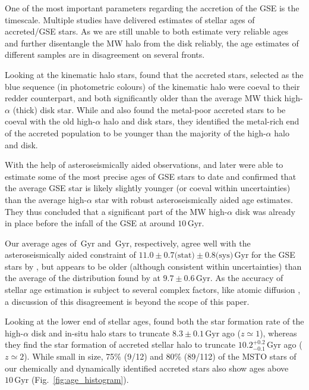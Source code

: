 \documentclass[fleqn,usenatbib]{mnras}
\newcommand{\Gyr}{\,\mathrm{Gyr}}	%
\begin{document}
One of the most important parameters regarding the accretion of the GSE is the timescale. Multiple studies \citep[e.g.][]{Jofre2010, Schuster2012, Hawkins2014, Gallart2019, Das2020, Montalban2020} have delivered estimates of stellar ages of accreted/GSE stars. As we are still unable to both estimate very reliable ages and further disentangle the MW halo from the disk reliably, the age estimates of different samples are in disagreement on several fronts.

Looking at the kinematic halo stars, \citet{Gallart2019} found that the accreted stars, selected as the blue sequence (in photometric colours) of the kinematic halo were coeval to their redder counterpart, and both significantly older than the average MW thick high-$\alpha$ (thick) disk star. While \citet{Schuster2012} and \citet{Hawkins2014} also found the metal-poor accreted stars to be coeval with the old high-$\alpha$ halo and disk stars, they identified the metal-rich end of the accreted population to be younger than the majority of the high-$\alpha$ halo and disk.

With the help of asteroseismically aided observations, \citet{Chaplin2020} and later \citet{Montalban2020} were able to estimate some of the most precise ages of GSE stars to date and confirmed that the average GSE star is likely slightly younger (or coeval within uncertainties) than the average high-$\alpha$ star with robust asteroseismically aided age estimates. They thus concluded that a significant part of the MW high-$\alpha$ disk was already in place before the infall of the GSE at around $10\Gyr$.

Our average ages of $\Gyr$ and $\Gyr$, respectively, agree well with the asteroseismically aided constraint of $11.0 \pm 0.7 \text{(stat)} \pm 0.8 \text{(sys)} \Gyr$ for the GSE stars by \citet{Chaplin2020}, but appears to be older (although consistent within uncertainties) than the average of the distribution found by \citet{Montalban2020} at $9.7\pm0.6\Gyr$. As the accuracy of stellar age estimation is subject to several complex factors, like atomic diffusion \citep[see e.g.][]{Jofre2011}, a discussion of this disagreement is beyond the scope of this paper.

Looking at the lower end of stellar ages, \citet{Bonaca2020} found both the star formation rate of the high-$\alpha$ disk and in-situ halo stars to truncate $8.3 \pm 0.1 \Gyr$ ago ($z \simeq 1$), whereas they find the star formation of accreted stellar halo to truncate $10.2_{-0.1}^{+0.2} \Gyr$ ago ($z \simeq 2$). While small in size, 75\% (9/12) and 80\% (89/112) of the MSTO stars of our chemically and dynamically identified accreted stars also show ages above $10\Gyr$ (Fig.~\ref{fig:age_histogram}).
\end{document}
